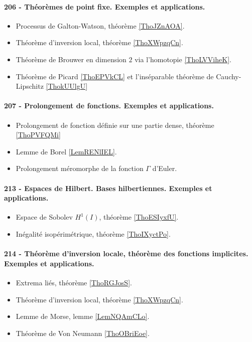 \paragraph{206 - Théorèmes de point fixe. Exemples et applications.}
\begin{itemize}
    \item Processus de Galton-Watson, théorème \ref{ThoJZnAOA}.
    \item Théorème d'inversion local, théorème \ref{ThoXWpzqCn}.
    \item Théorème de Brouwer en dimension \( 2\) via l'homotopie \ref{ThoLVViheK}.
    \item Théorème de Picard \ref{ThoEPVkCL} et l'inséparable théorème de Cauchy-Lipschitz \ref{ThokUUlgU}
\end{itemize}
\paragraph{207 - Prolongement de fonctions. Exemples et applications.}
\begin{itemize}
    \item Prolongement de fonction définie sur une partie dense, théorème \ref{ThoPVFQMi}
    \item Lemme de Borel \ref{LemRENlIEL}.
    \item Prolongement méromorphe de la fonction \( \Gamma\) d'Euler.
\end{itemize}
\paragraph{213 - Espaces de Hilbert. Bases hilbertiennes. Exemples et applications.}
\begin{itemize}
    \item Espace de Sobolev \( H^1(I)\), théorème \ref{ThoESIyxfU}.
    \item Inégalité isopérimétrique, théorème \ref{ThoIXyctPo}.
\end{itemize}
\paragraph{214 - Théorème d’inversion locale, théorème des fonctions implicites. Exemples et applications.}
\begin{itemize}
    \item Extrema liés, théorème \ref{ThoRGJosS}.
    \item Théorème d'inversion local, théorème \ref{ThoXWpzqCn}.
    \item Lemme de Morse, lemme \ref{LemNQAmCLo}.
    \item Théorème de Von Neumann \ref{ThoOBriEoe}.
\end{itemize}
